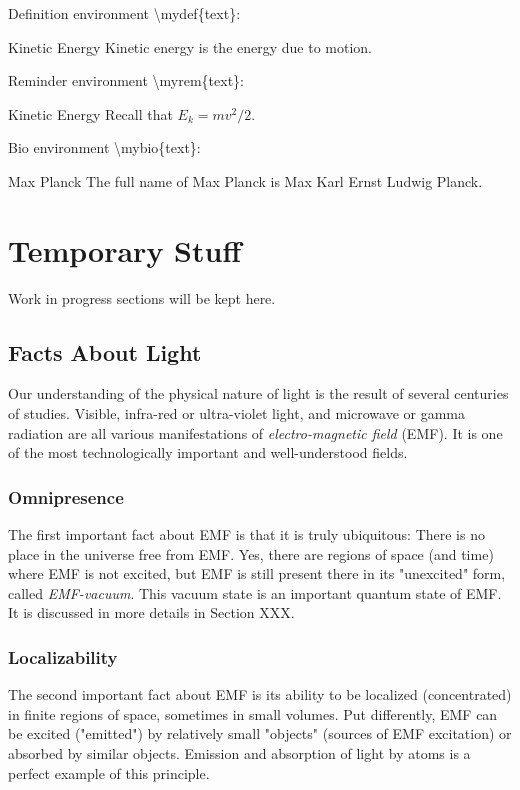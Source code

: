 Definition environment \textbackslash mydef\{text\}:
\begin{mydef}{Kinetic Energy}
	Kinetic energy is the energy due to motion.
\end{mydef}

Reminder environment \textbackslash myrem\{text\}:
\begin{myrem}{Kinetic Energy}
	Recall that $E_k=mv^2/2$.
\end{myrem}

Bio environment \textbackslash mybio\{text\}:
\begin{mybio}{Max Planck}
	The full name of Max Planck is Max Karl Ernst Ludwig Planck.
\end{mybio}

\section{Temporary Stuff}
Work in progress sections will be kept here.

\subsection{Facts About Light}
Our understanding of the physical nature of light is the result of several centuries of studies. Visible, infra-red or ultra-violet  light, and microwave or gamma radiation are all various manifestations of \emph{electro-magnetic field} (EMF). It is one of the most technologically important and well-understood fields. 

\subsubsection*{Omnipresence}
The first important fact about EMF is that it is truly ubiquitous: There is no place in the universe free from EMF. Yes, there are regions of space (and time) where EMF is not excited, but EMF is still present there in its "unexcited" form, called \emph{EMF-vacuum}. This vacuum state is an important quantum state of EMF. It is discussed in more details in Section XXX.

\subsubsection*{Localizability}
The second important fact about EMF is its ability to be localized (concentrated) in finite regions of space, sometimes in small volumes. Put differently, EMF can be excited ("emitted") by relatively small "objects" (sources of EMF excitation) or absorbed by similar objects. Emission and absorption of light by atoms is a perfect example of this principle.

